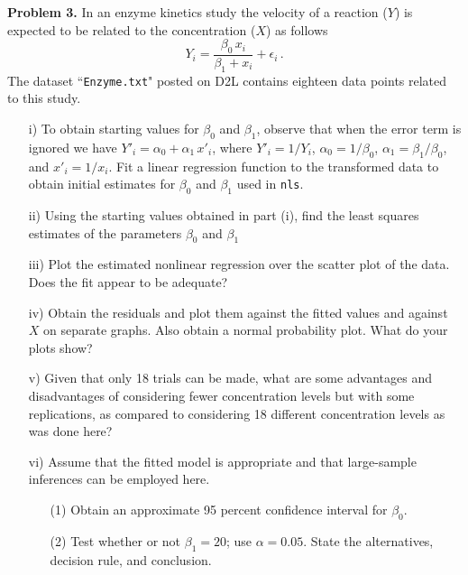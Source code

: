 \documentclass[11pt]{report}
\begin{document}
\noindent 
{\bf Problem 3. } In an enzyme kinetics study the velocity of a reaction ($Y$) is expected to be related to the concentration ($X$) as follows  
$$Y_i=\frac{\beta_0 \,x_i}{\beta_1+x_i}+\epsilon_i\,.$$
The dataset ``{\tt Enzyme.txt}" posted on D2L contains eighteen data points related to this study. 
\begin{itemize}
\item[i) ] To obtain starting values for $\beta_0$ and $\beta_1$, observe that when the error term is ignored we have $Y'_i=\alpha_0+\alpha_1\,x'_i$, where $Y'_i=1/Y_i$, $\alpha_0=1/\beta_0$, $\alpha_1=\beta_1/\beta_0$, and $x'_i=1/x_i$. Fit a linear regression function to the transformed data to obtain initial estimates for $\beta_0$ and $\beta_1$ used in {\tt nls}. 
\item[ii) ] Using the starting values obtained in part (i), find the least squares estimates of the parameters $\beta_0$ and $\beta_1$ 
\item[iii) ] Plot the estimated nonlinear regression over the scatter plot of the data. Does the fit appear to be adequate?
\item[iv) ] Obtain the residuals and plot them against the fitted values and against $X$ on separate graphs. Also obtain a normal probability plot. What do your plots show? 
\item[v) ] Given that only 18 trials can be made, what are some advantages and disadvantages of considering fewer concentration levels but with some replications, as compared to considering 18 different concentration levels as was done here?
\item[vi) ] Assume that the fitted model is appropriate and that large-sample inferences can be employed here. 
\begin{itemize}
\item[(1) ] Obtain an approximate 95 percent confidence interval for $\beta_0$.
\item[(2) ] Test whether or not $\beta_1=20$; use $\alpha=0.05$. State the alternatives, decision rule, and conclusion.  
\end{itemize}
\end{itemize}
\end{document}
